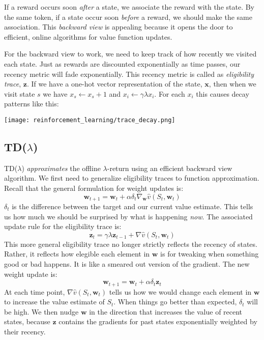 If a reward occurs soon \textit{after} a state, we associate the reward with the state. By the same token, if a state occur soon \textit{before} a reward, we should make the same association. This \textit{backward view} is appealing because it opens the door to efficient, online algorithms for value function updates.

For the backward view to work, we need to keep track of how recently we visited each state. Just as rewards are discounted exponentially as time passes, our recency metric will fade exponentially. This recency metric is called as \textit{eligibility trace}, $\mathbf{z}$. If we have a one-hot vector representation of the state, $\mathbf{x}$, then when we visit state $s$ we have $x_s \leftarrow x_s+1$ and $x_{i} \leftarrow \gamma \lambda x_i $. For each $x_i$ this causes decay patterns like this:

\begin{center}\texttt{[image: reinforcement\_learning/trace\_decay.png]}\end{center}

\subsection{TD($\lambda$)}

TD($\lambda$) \textit{approximates} the offline $\lambda$-return using an efficient backward view algorithm. We first need to generalize eligibility traces to function approximation. Recall that the general formulation for weight updates is:
$$ \mathbf{w}_{t+1} = \mathbf{w}_t + \alpha \delta_t \nabla_\mathbf{w} \hat{v}(S_t, \mathbf{w}_t) $$
$\delta_t$ is the difference between the target and our current value estimate. This tells us how much we should be surprised by what is happening \textit{now}. The associated update rule for the eligibility trace is:
$$
\mathbf{z}_{t} = \gamma \lambda \mathbf{z}_{t-1} + \nabla \hat{v}(S_t, \mathbf{w}_{t})
$$
This more general eligibility trace no longer strictly reflects the recency of states. Rather, it reflects how elegible each element in $\mathbf{w}$ is for tweaking when something good or bad happens. It is like a smeared out version of the gradient. The new weight update is:
$$ \mathbf{w}_{t+1} = \mathbf{w}_t + \alpha \delta_t \mathbf{z}_t $$
At each time point, $\nabla \hat{v}(S_t, \mathbf{w}_{t})$ tells us how we would change each element in $\mathbf{w}$ to increase the value estimate of $S_t$. When things go better than expected, $\delta_t$ will be high. We then nudge $\mathbf{w}$ in the direction that increases the value of recent states, because $\mathbf{z}$ contains the gradients for past states exponentially weighted by their recency.

